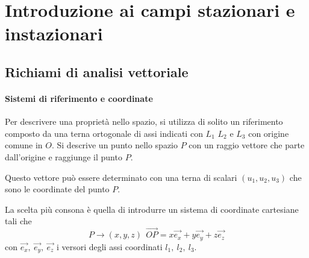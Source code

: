 
\section{Introduzione ai campi stazionari e instazionari}
\subsection{Richiami di analisi vettoriale}
\paragraph{Sistemi di riferimento e coordinate}
Per descrivere una proprietà nello spazio, si utilizza di solito un riferimento composto da 
una terna ortogonale di assi indicati con $L_1$ $L_2$ e $L_3$ con origine comune in $O$.
Si descrive un punto nello spazio $P$ con un raggio vettore che parte dall'origine e 
raggiunge il punto $P$.

\begin{figure}[h] %
\centering
{}
\end{figure}

Questo vettore può essere determinato con una terna di scalari $(u_1,u_2,u_3)$ che sono le 
coordinate del punto $P$.

La scelta più consona è quella di introdurre un sistema di coordinate cartesiane tali che 
$$
P \rightarrow (x,y,z)\ \ \vec{OP} = x\vec{e_x} + y\vec{e_y} + z\vec{e_z}
$$
con $\vec{e_x},\ \vec{e_y},\ \vec{e_z}$ i versori degli assi coordinati $l_1,\ l_2,\ l_3$.

